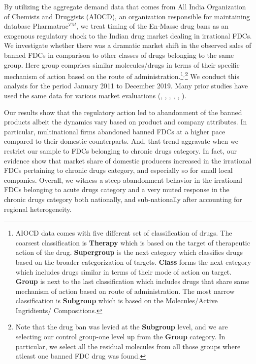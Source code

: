 \documentclass[AER]{AEA}
\theoremstyle{theorem}
\begin{document}
By utilizing the aggregate demand data that comes from All India Organization of Chemists and Druggists (AIOCD), an organization responsible for maintaining database Pharmatrac$^{TM}$, we treat timing of the En-Masse drug bans as an exogenous regulatory shock to the Indian drug market dealing in irrational FDCs. We investigate whether there was a dramatic market shift in the observed sales of banned FDCs in comparison to other classes of drugs belonging to the same group. Here group comprises similar molecules/drugs in terms of their specific mechanism of action based on the route of administration.\footnote{AIOCD data comes with five different set of classification of drugs. The coarsest classification is \textbf{Therapy} which is based on the target of therapeutic action of the drug. \textbf{Supergroup} is the next  category which classifies drugs based on the broader categorization of targets. \textbf{Class} forms the next category which includes drugs similar in terms of their mode of action on target. \textbf{Group} is next to the last classification which includes drugs that share same mechanism of action based on route of administration. The most narrow classification is \textbf{Subgroup} which is  based on the Molecules/Active Ingridients/ Compositions.}$^{,}$\footnote{Note that the drug ban was levied at the \textbf{Subgroup} level, and we are selecting our control group-one level up from the \textbf{Group} category. In particular, we select all the residual molecules from all those groups where atleast one banned FDC drug was found.} We conduct this analysis for the period January 2011 to December 2019. Many prior studies have used the same data for various market evaluations (\cite{dutta2011free}, \cite{bhaskarabhatla2017role}, \cite{adbi2020stakeholder}, \cite{aggarwal2020can}, \cite{aggarwal2020science},  \cite{bansal2021politics}). 

Our results show that the regulatory action led to abandonment of the banned products albeit the dynamics vary based on product and company attributes. In particular, multinational firms abandoned banned FDCs at a higher pace compared to their domestic counterparts. And, that trend aggravate when we restrict our sample to FDCs belonging to chronic drugs category. In fact, our evidence show that market share of  domestic producers increased in the irrational FDCs pertaining to chronic drugs category, and especially so for small local companies. Overall, we witness a steep abandonment behavior in the irrational FDCs belonging to acute drugs category and a very muted response in the chronic drugs category both nationally, and sub-nationally after accounting for regional heterogeneity. 
\end{document}
